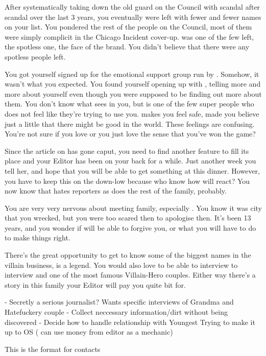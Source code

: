 \documentclass[char]{LRSguildcamp1}
\begin{document}
After systematically taking down the old guard on the Council with scandal after scandal over the last 3 years, you eventually were left with fewer and fewer names on your list. You pondered the rest of the people on the Council, most of them were simply complicit in the Chicago Incident cover-up. \cYoungest{} was one of the few left, the spotless one, the face of the brand. You didn't believe that there were any spotless people left. 
 
You got yourself signed up for the emotional support group run by \cYoungest{}. Somehow, it wasn't what you expected. You found yourself opening up with \cYoungest{}, telling \cYoungest{} more and more about yourself even though you were supposed to be finding out more about them. You don't know what \cYoungest{} sees in you, but \cYoungest{} is one of the few super people who does not feel like they're trying to use you. \cYoungest{} makes you feel safe, made you believe just a little that there might be good in the world. These feelings are confusing. You're not sure if you love \cYoungest{} or you just love the sense that you've won the game?

Since the article on \cYoungest{} has gone caput, you need to find another feature to fill its place and your Editor has been on your back for a while. Just another week you tell her, and hope that you will be able to get something at this dinner. However, you have to keep this on the down-low because who know how \cYoungest{} will react? You now know that \cYoungest{} hates reporters as does the rest of the family, probably. 

You are very very nervous about meeting \cYoungest{} family, especially \cOS{}. You know it was \cOS{} city that you wrecked, but you were too scared then to apologise then. It's been 13 years, and you wonder if \cOS{} will be able to forgive you, or what you will have to do to make things right.

There’s the great opportunity to get to know some of the biggest names in the villain business, \cGrandma{} is a legend. You would also love to be able to interview to interview \cOldest{} and \cOS{} one of the most famous Villain-Hero couples. Either way there's a story in this family your Editor will pay you quite bit for. 




\begin{itemz}[Goals]
	\item 
\end{itemz}

\begin{itemz}[Notes]
	\item 
	- Secretly a serious journalist?  Wants specific interviews of Grandma and Hatefuckery couple 
	- Collect neccessary information/dirt without being discovered
	- Decide how to handle relationship with Youngest 
	Trying to make it up to OS ( can use money from editor as a mechanic)
	
\end{itemz}

\begin{contacts}
	\contact{} This is the format for contacts 
\end{contacts}
\end{document}
